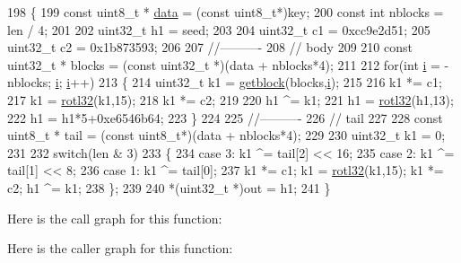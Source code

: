 \begin{DoxyCode}
198 \{
199   \textcolor{keyword}{const} uint8\_t * \hyperlink{topology-example-sim_8cc_a26c65296e316af77b787dc77469bb2a4}{data} = (\textcolor{keyword}{const} uint8\_t*)key;
200   \textcolor{keyword}{const} \textcolor{keywordtype}{int} nblocks = len / 4;
201 
202   uint32\_t h1 = seed;
203 
204   uint32\_t c1 = 0xcc9e2d51;
205   uint32\_t c2 = 0x1b873593;
206 
207   \textcolor{comment}{//----------}
208   \textcolor{comment}{// body}
209 
210   \textcolor{keyword}{const} uint32\_t * blocks = (\textcolor{keyword}{const} uint32\_t *)(data + nblocks*4);
211 
212   \textcolor{keywordflow}{for}(\textcolor{keywordtype}{int} \hyperlink{bernuolliDistribution_8m_a6f6ccfcf58b31cb6412107d9d5281426}{i} = -nblocks; \hyperlink{bernuolliDistribution_8m_a6f6ccfcf58b31cb6412107d9d5281426}{i}; \hyperlink{bernuolliDistribution_8m_a6f6ccfcf58b31cb6412107d9d5281426}{i}++)
213   \{
214     uint32\_t k1 = \hyperlink{group__hash__murmur3_ga45409abb5582f7786cd88c3c8e19744c}{getblock}(blocks,\hyperlink{bernuolliDistribution_8m_a6f6ccfcf58b31cb6412107d9d5281426}{i});
215 
216     k1 *= c1;
217     k1 = \hyperlink{group__hash__murmur3_ga5ad09e63b7268f407b727713d0f6687a}{rotl32}(k1,15);
218     k1 *= c2;
219     
220     h1 ^= k1;
221     h1 = \hyperlink{group__hash__murmur3_ga5ad09e63b7268f407b727713d0f6687a}{rotl32}(h1,13); 
222     h1 = h1*5+0xe6546b64;
223   \}
224 
225   \textcolor{comment}{//----------}
226   \textcolor{comment}{// tail}
227 
228   \textcolor{keyword}{const} uint8\_t * tail = (\textcolor{keyword}{const} uint8\_t*)(data + nblocks*4);
229 
230   uint32\_t k1 = 0;
231 
232   \textcolor{keywordflow}{switch}(len & 3)
233   \{
234   \textcolor{keywordflow}{case} 3: k1 ^= tail[2] << 16;
235   \textcolor{keywordflow}{case} 2: k1 ^= tail[1] << 8;
236   \textcolor{keywordflow}{case} 1: k1 ^= tail[0];
237           k1 *= c1; k1 = \hyperlink{group__hash__murmur3_ga5ad09e63b7268f407b727713d0f6687a}{rotl32}(k1,15); k1 *= c2; h1 ^= k1;
238   \};
239 
240   *(uint32\_t *)out = h1;
241 \}
\end{DoxyCode}


Here is the call graph for this function\+:




Here is the caller graph for this function\+:


